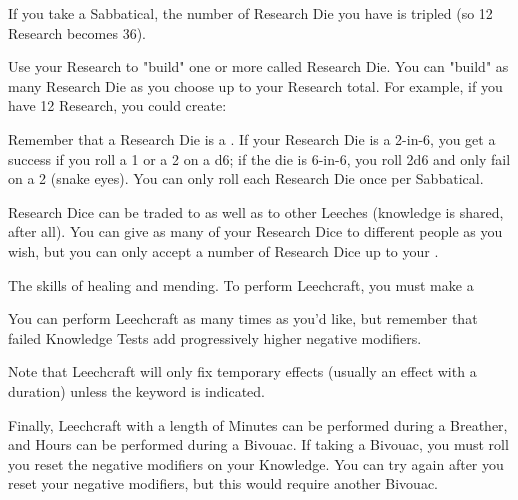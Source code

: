 {If you take a Sabbatical, the number of Research Die you have is tripled (so 12 Research becomes 36).

Use your Research to "build" one or more \KNACK called Research Die. You can "build" as many Research Die as you choose up to your Research total. For example, if you have 12 Research, you could create:


Remember that a Research Die is a \KNACK.  If your Research Die is a 2-in-6, you get a success if you roll a 1 or a 2 on a d6; if the die is 6-in-6, you roll 2d6 and only fail on a 2 (snake eyes).  You can only roll each Research Die once per Sabbatical.

Research Dice can be traded to  as well as to other Leeches (knowledge is shared, after all). You can give as many of your Research Dice to different people as you wish, but you can only accept a number of Research Dice up to your .

\newpage


The skills of healing and mending.  To perform Leechcraft, you must make a 




  You can perform Leechcraft as many times as you'd like, but remember that failed Knowledge Tests add progressively higher negative modifiers.

  Note that Leechcraft will only fix temporary effects (usually an effect with a  duration) unless the  keyword is indicated.

  Finally, Leechcraft with a length of Minutes can be performed during a Breather, and Hours can be performed during a Bivouac.  If taking a Bivouac, you must roll  you reset the negative modifiers on your Knowledge.  You can try again after you reset your negative modifiers, but this would require another Bivouac.  


}

